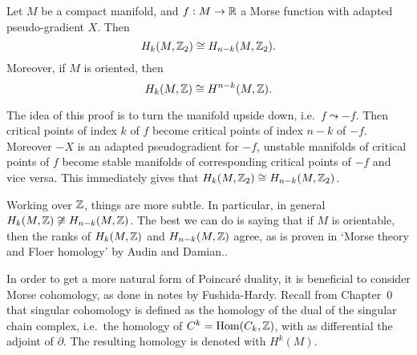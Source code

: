 \begin{theorem}
    Let $M$ be a compact manifold, and $f: M \to  \mathbb{R}$ a Morse function with adapted pseudo-gradient $X$.
    Then
    \[
        H_k(M, \mathbb{Z}_2) \cong H_{n-k}(M, \mathbb{Z}_2)
    .\]
    Moreover, if $M$ is oriented, then \[
         H_{k}(M, \mathbb{Z}) \cong H^{n-k}(M, \mathbb{Z})
    .\]
\end{theorem}
\begin{myproof}
    The idea of this proof is to turn the manifold upside down, i.e.\ $f\leadsto -f$.
    Then critical points of index $k$ of $f$  become critical points of index $n-k$ of  $-f$.
    Moreover $-X$ is an adapted pseudogradient for $-f$, unstable manifolds of critical points of $f$ become stable manifolds of corresponding critical points of $-f$ and vice versa.
    This immediately gives that $H_k(M, \mathbb{Z}_2) \cong H_{n-k}(M, \mathbb{Z}_2)$.

    Working over $\mathbb{Z}$, things are more subtle.
    In particular, in general $H_k(M, \mathbb{Z}) \not \cong H_{n-k}(M, \mathbb{Z})$.
    The best we can do is saying that if $M$ is orientable, then the ranks of  $H_k(M, \mathbb{Z})$ and $H_{n-k}(M, \mathbb{Z})$ agree,
    as is proven in `Morse theory and Floer homology' by Audin and Damian..

    In order to get a more natural form of Poincaré duality, it is beneficial to consider Morse cohomology, as done in notes by Fushida-Hardy.
    Recall from Chapter~0 that singular cohomology is defined as the homology of the dual of the singular chain complex, i.e.\ the homology of $C^{k} = \operatorname{Hom}(C_k, \mathbb{Z})$, with as differential the adjoint of $\partial$. The resulting homology is denoted with $H^{k}(M)$.


\end{myproof}
